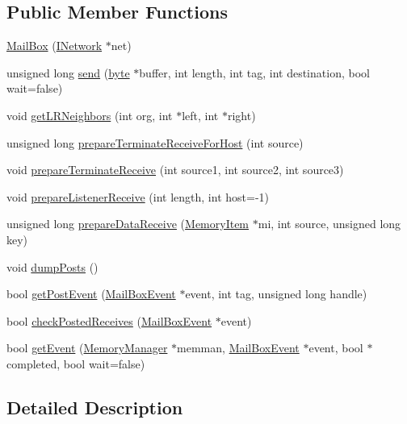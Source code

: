 \subsection*{Public Member Functions}
\begin{DoxyCompactItemize}
\item 
\hyperlink{class_mail_box_a534ac0f734937aa7f2409bea4da8de16}{MailBox} (\hyperlink{class_i_network}{INetwork} $\ast$net)
\item 
unsigned long \hyperlink{class_mail_box_ae6b86c4b322220e0a416dadec6e50877}{send} (\hyperlink{engine_8hpp_a0c8186d9b9b7880309c27230bbb5e69d}{byte} $\ast$buffer, int length, int tag, int destination, bool wait=false)
\item 
void \hyperlink{class_mail_box_a1fb17b7247e23d29fc0f51e980717acf}{getLRNeighbors} (int org, int $\ast$left, int $\ast$right)
\item 
unsigned long \hyperlink{class_mail_box_a45435c4ffb07fe13da0bcdacdde49bb6}{prepareTerminateReceiveForHost} (int source)
\item 
void \hyperlink{class_mail_box_a9730cc56fbce0325496bb67970572015}{prepareTerminateReceive} (int source1, int source2, int source3)
\item 
void \hyperlink{class_mail_box_aa9c92ef9ed35dbd1ebc4aae5f16876bd}{prepareListenerReceive} (int length, int host=-\/1)
\item 
unsigned long \hyperlink{class_mail_box_a467ff1952f56669a619092d57824637d}{prepareDataReceive} (\hyperlink{struct_memory_item}{MemoryItem} $\ast$mi, int source, unsigned long key)
\item 
void \hyperlink{class_mail_box_a541c1f871502eec356801ed5657f56c3}{dumpPosts} ()
\item 
bool \hyperlink{class_mail_box_ad63db95e264ebb4d4bf090ad3e3d0394}{getPostEvent} (\hyperlink{struct_mail_box_event}{MailBoxEvent} $\ast$event, int tag, unsigned long handle)
\item 
bool \hyperlink{class_mail_box_a0dc7cda2ef943be7763bf18494e9422d}{checkPostedReceives} (\hyperlink{struct_mail_box_event}{MailBoxEvent} $\ast$event)
\item 
bool \hyperlink{class_mail_box_ad920ff9b804620414e814322462c783b}{getEvent} (\hyperlink{class_memory_manager}{MemoryManager} $\ast$memman, \hyperlink{struct_mail_box_event}{MailBoxEvent} $\ast$event, bool $\ast$completed, bool wait=false)
\end{DoxyCompactItemize}


\subsection{Detailed Description}


